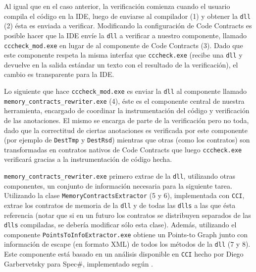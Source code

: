 \documentclass[12pt,a4paper]{article}
\newcommand\mono[1]{\texttt{#1}}
\begin{document}
			Al igual que en el caso anterior, la verificación comienza cuando el usuario compila el código en la IDE, luego de enviarse al compilador (1) y obtener la \mono{dll} (2) ésta es enviada a verificar. Modificando la configuración de Code Contracts es posible hacer que la IDE envíe la \mono{dll} a verificar a nuestro componente, llamado \mono{cccheck\_mod.exe} en lugar de al componente de Code Contracts (3). Dado que este componente respeta la misma interfaz que \mono{cccheck.exe} (recibe una \mono{dll} y devuelve en la salida estándar un texto con el resultado de la verificación), el cambio es transparente para la IDE.

			Lo siguiente que hace \mono{cccheck\_mod.exe} es enviar la \mono{dll} al componente llamado \mono{memory\_contracts\_rewriter.exe} (4), éste es el componente central de nuestra herramienta, encargado de coordinar la instrumentación del código y verificación de las anotaciones. El mismo se encarga de parte de la verificación pero no toda, dado que la correctitud de ciertas anotaciones es verificada por este componente (por ejemplo de \mono{DestTmp} y \mono{DestRsd}) mientras que otras (como los contratos) son transformadas en contratos nativos de Code Contracts que luego \mono{cccheck.exe} verificará gracias a la instrumentación de código hecha.

			\mono{memory\_contracts\_rewriter.exe} primero extrae de la \mono{dll}, utilizando otras componentes, un conjunto de información necesaria para la siguiente tarea. Utilizando la clase \mono{MemoryContractsExtractor} (5 y 6), implementada con \mono{CCI}, extrae los contratos de memoria de la \mono{dll} y de todas las \mono{dlls} a las que ésta referencia (notar que si en un futuro los contratos se distribuyen separados de las \mono{dlls} compiladas, se debería modificar sólo esta clase). Además, utilizando el componente \mono{PointsToInfoExtractor.exe} obtiene un Points-to Graph junto con información de escape (en formato XML) de todos los métodos de la \mono{dll} (7 y 8). Este componente está basado en un análisis disponible en \mono{CCI} hecho por Diego Garbervetsky para Spec\#, implementado según \cite{BFGL07}.
\end{document}
